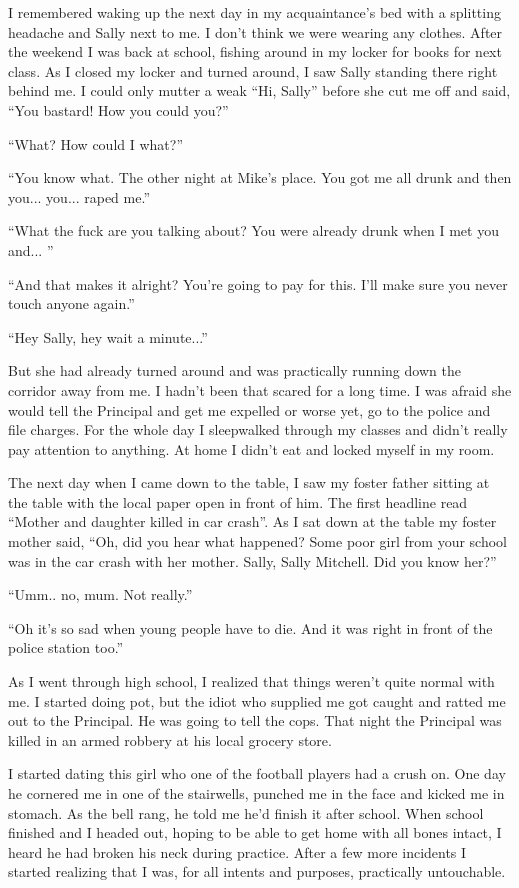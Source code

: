 \documentclass[11pt,letterpaper]{article}
\begin{document}
I remembered waking up the next day in my acquaintance's bed with a splitting headache and Sally next to me. I don't think we were wearing any clothes. After the weekend I was back at school, fishing around in my locker for books for next class. As I closed my locker and turned around, I saw Sally standing there right behind me. I could only mutter a weak ``Hi, Sally'' before she cut me off and said, ``You bastard! How you could you?''

``What? How could I what?''

``You know what. The other night at Mike's place. You got me all drunk and then you... you... raped me.''

``What the fuck are you talking about? You were already drunk when I met you and... ''

``And that makes it alright? You're going to pay for this. I'll make sure you never touch anyone again.''

``Hey Sally, hey wait a minute...''

But she had already turned around and was practically running down the corridor away from me. I hadn't been that scared for a long time. I was afraid she would tell the Principal and get me expelled or worse yet, go to the police and file charges. For the whole day I sleepwalked through my classes and didn't really pay attention to anything. At home I didn't eat and locked myself in my room.

The next day when I came down to the table, I saw my foster father sitting at the table with the local paper open in front of him. The first headline read ``Mother and daughter killed in car crash''. As I sat down at the table my foster mother said, ``Oh, did you hear what happened? Some poor girl from your school was in the car crash with her mother. Sally, Sally Mitchell. Did you know her?''

``Umm.. no, mum. Not really.''

``Oh it's so sad when young people have to die. And it was right in front of the police station too.''


As I went through high school, I realized that things weren't quite normal with me. I started doing pot, but the idiot who supplied me got caught and ratted me out to the Principal. He was going to tell the cops. That night the Principal was killed in an armed robbery at his local grocery store. 

I started dating this girl who one of the football players had a crush on. One day he cornered me in one of the stairwells, punched me in the face and kicked me in stomach. As the bell rang, he told me he'd finish it after school. When school finished and I headed out, hoping to be able to get home with all bones intact, I heard he had broken his neck during practice. After a few more incidents I started realizing that I was, for all intents and purposes, practically untouchable.
\end{document}
